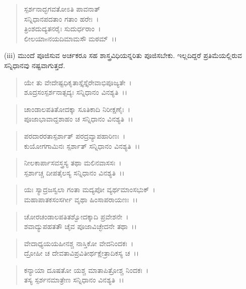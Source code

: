 \begin{verse}
ಸ್ಪರ್ಶನಾದ್ಭಗವತೋಽತಿ ಪಾವನಾತ್\\ ಸನ್ನಿಧಾನಪದತಾಂ ಗತಾಂ ಹರೇಃ~।\\ ತ್ರಿಂಶದುದ್ಯತನರೈಃ ಸುದುರ್ಧರಾಂ~।\\ ಲೀಲಯಾsನಯದಿಮಾಮಸೌ ಮಠಮ್~।।
\end{verse}

(iii) ಮುಂದೆ ಪೂಜಿಸುವ ಅರ್ಚಕರೂ ಸಹ ಶಾಸ್ತ್ರವಿಧಿಯನ್ನರಿತು ಪೂಜಿಸಬೇಕು. ಇಲ್ಲದಿದ್ದರೆ ಪ್ರತಿಮೆಯಲ್ಲಿರುವ ಸನ್ನಿಧಾನವು ನಷ್ಟವಾಗುತ್ತದೆ.

\begin{verse}
ಯೇ ತು ವೇದೇಷ್ಟಧಿಕೃತಾಸ್ತೈಸ್ತೈರೇವಾಭಿಪೂಜ್ಯತೇ~।\\ ಶೂದ್ರಸಂಸ್ಪರ್ಶನಾತ್ಸದ್ಯಃ ಸನ್ನಿಧಾನಂ ವಿನಶ್ಯತಿ~।।
\end{verse}

\begin{verse}
ಚಾಂಡಾಲಪತಿತೋದಕ್ಕಾ ಸೂತಿಕಾದಿ ನಿರೀಕ್ಷಣೈಃ~।\\ ಪೂಜಾಭಾವಾದ್ದಶಾಹಂ ಚ ಸನ್ನಿಧಾನಂ ವಿನಶ್ಯತಿ~।।
\end{verse}

\begin{verse}
ಪರದಾರರತಾಸ್ಪರ್ಶಾತ್ ಪರದ್ರವ್ಯಾಪಹಾರಿಣಃ~।\\ ಕುಯೋಗಗಾಮಿನಃ ಸ್ಪರ್ಶಾತ್ ಸನ್ನಿಧಾನಂ ವಿನಶ್ಯತಿ~।।
\end{verse}

\begin{verse}
ನೀಲಕಾರ್ಪಾಸವಸ್ತ್ರಸ್ಯ ತಥಾ ಮಲಿನವಾಸಸಃ~।\\ ಸ್ಪರ್ಶಾಚ್ಚ ದೀಪತೈಲಸ್ಯ ಸನ್ನಿಧಾನಂ ವಿನಶ್ಯತಿ~।।
\end{verse}

\begin{verse}
ಯಃ ಸ್ಯಾದ್ರಜಸ್ವಲಾ ಗಂತಾ ಮದ್ಯಪೋ ವ್ಯರ್ಥಮಾಂಸಭುಕ್~।\\ ಮಹಾಪಾತಕಸಂಸರ್ಗೀ ವೃಥಾ ಹಿಂಸಾಪರಾಯಣಃ~।।
\end{verse}

\begin{verse}
ಚೋರಚಂಡಾಲಪತಿತಶ್ವೋದಕ್ಕಾದಿ ಪ್ರವೇಶನೇ~।\\ ಶವಾದ್ಯುಪಹತತೌ ಚೈವ ಪೂಜಾವಿಚ್ಛೇದನೇ ತಥಾ~।।
\end{verse}

\begin{verse}
ವೇದಾಧ್ಯಯಯಹೀನಶ್ಚ ನಾಸ್ತಿಕೋ ವೇದನಿಂದಕಃ~।\\ ದ್ರೋಹೀ ಚ ದೇವತಾವಿಪ್ರವಿತೀರ್ಥಕ್ಷೇತ್ರಾದಿಕಸ್ಯ ಚ~।।
\end{verse}

\begin{verse}
ಕನ್ಯಾಯಾ ದೂಷತೋ ಯಶ್ಚ ಮಾತಾಪಿತ್ರೋಶ್ಚ ನಿಂದಕಃ~।\\ ತಸ್ಯ ಸ್ಪರ್ಶನಮಾತ್ರೇಣ ಸನ್ನಿಧಾನಂ ವಿನಶ್ಯತಿ~।।
\end{verse}

